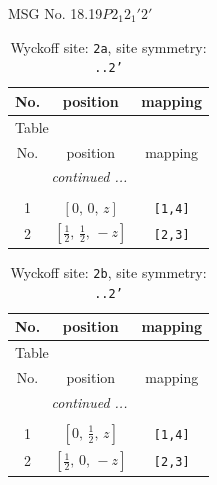 \documentclass[fleqn,8pt]{jsarticle}
\begin{document}
\setcounter{MaxMatrixCols}{32}

\renewcommand{\tablename}{Table~}
\renewcommand{\figurename}{Figure~}
\begin{center}
\LARGE
MSG No. 18.19\quad$P2_{1}2_{1}'2'$
\end{center}
\renewcommand{\arraystretch}{1.2}
\begin{longtable}{ccc}
\caption{Wyckoff site: {\tt 2a}, site symmetry: {\tt ..2'}}
 \\
 \hline \hline
No. & position & mapping \\ \hline \endfirsthead

\multicolumn{2}{l}{\tablename\ \thetable{}} \\
 \hline \hline
No. & position & mapping \\ \hline \endhead

 \hline \hline
\multicolumn{2}{r}{\footnotesize\it continued ...} \\ \endfoot

 \hline \hline
\multicolumn{2}{r}{} \\ \endlastfoot

1 & $\left[ 0,\, 0,\, z \right]$ & {\tt [1,4]} \\ \hline
2 & $\left[ \frac{1}{2},\, \frac{1}{2},\, - z \right]$ & {\tt [2,3]} \\
\end{longtable}
\renewcommand{\arraystretch}{1.2}
\begin{longtable}{ccc}
\caption{Wyckoff site: {\tt 2b}, site symmetry: {\tt ..2'}}
 \\
 \hline \hline
No. & position & mapping \\ \hline \endfirsthead

\multicolumn{2}{l}{\tablename\ \thetable{}} \\
 \hline \hline
No. & position & mapping \\ \hline \endhead

 \hline \hline
\multicolumn{2}{r}{\footnotesize\it continued ...} \\ \endfoot

 \hline \hline
\multicolumn{2}{r}{} \\ \endlastfoot

1 & $\left[ 0,\, \frac{1}{2},\, z \right]$ & {\tt [1,4]} \\ \hline
2 & $\left[ \frac{1}{2},\, 0,\, - z \right]$ & {\tt [2,3]} \\
\end{longtable}
\renewcommand{\arraystretch}{1.2}
\end{document}
